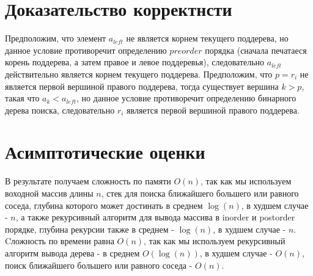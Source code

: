 \documentclass[12pt]{article}
\begin{document}
	

\section{Доказательство корректнсти}
Предположим, что элемент $a_{left}$ не является корнем текущего поддерева, но данное условие противоречит определению $preorder$ порядка (сначала печатаеся корень поддерева, а затем правое и левое поддеревья), следовательно $a_{left}$ действительно является корнем текущего поддерева. Предположим, что $p = r_i$ не является первой вершиной правого поддерева, тогда существует вершина $k > p$, такая что $a_k < a_{left}$, но данное условие противоречит определению бинарного дерева поиска, следовательно $r_i$ является первой вершиной правого поддерева.



\section{Асимптотические оценки}
В результате получаем сложность по памяти $O(n)$, так как мы используем воходной массив длины $n$, стек для поиска ближайшего большего или равного соседа, глубина которого может достинать в среднем $\log (n)$, в худшем случае -  $n$, а также рекурсивный алгоритм для вывода массива в inorder и postorder порядке, глубина рекурсии также в среднем - $\log (n)$, в худшем случае - $n$. Cложность по времени равна $O(n)$, так как мы используем рекурсивный алгоритм вывода дерева - в среднем $O(\log (n))$, в худшем случае - $O(n)$, поиск ближайшего большего или равного соседа - $O(n)$.
\end{document}
